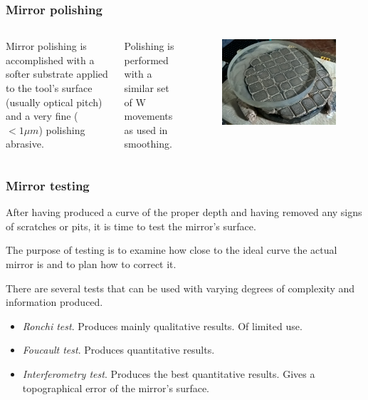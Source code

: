 \documentclass{beamer}
\begin{document}
\begin{frame}
\frametitle{Mirror polishing}
\begin{columns}
Mirror polishing is accomplished with a softer substrate applied to the tool's surface (usually optical pitch) and a very fine ($<1 \mu m$) polishing abrasive.

Polishing is performed with a similar set of W movements as used in smoothing.
\begin{figure}
\includegraphics[scale=0.2]{assets/polishing.jpg}
\end{figure}
\end{columns}
\end{frame}

\begin{frame}
\frametitle{Mirror testing}
After having produced a curve of the proper depth and having removed any signs of scratches or pits, it is time to test the mirror's surface.

The purpose of testing is to examine how close to the ideal curve the actual mirror is and to plan how to correct it.

There are several tests that can be used with varying degrees of complexity and information produced.
\begin{itemize}
\item \textit{Ronchi test}. Produces mainly qualitative results. Of limited use.
\item \textit{Foucault test}. Produces quantitative results.
\item \textit{Interferometry test}. Produces the best quantitative results. Gives a topographical error of the mirror's surface.
\end{itemize}
\end{frame}
\end{document}
